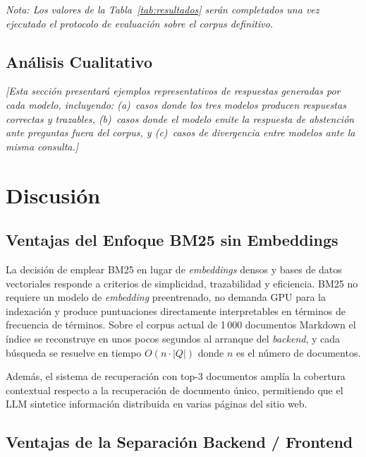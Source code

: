 \documentclass[conference]{IEEEtran}
\begin{document}
\textit{Nota: Los valores de la Tabla~\ref{tab:resultados} serán completados
una vez ejecutado el protocolo de evaluación sobre el corpus definitivo.}

\subsection{Análisis Cualitativo}

\textit{[Esta sección presentará ejemplos representativos de respuestas
generadas por cada modelo, incluyendo: (a)~casos donde los tres modelos
producen respuestas correctas y trazables, (b)~casos donde el modelo emite
la respuesta de abstención ante preguntas fuera del corpus, y (c)~casos de
divergencia entre modelos ante la misma consulta.]}

\section{Discusión}
\label{sec:disc}

\subsection{Ventajas del Enfoque BM25 sin Embeddings}

La decisión de emplear BM25 en lugar de \textit{embeddings} densos y bases de
datos vectoriales responde a criterios de simplicidad, trazabilidad y
eficiencia. BM25 no requiere un modelo de \textit{embedding} preentrenado, no
demanda GPU para la indexación y produce puntuaciones directamente
interpretables en términos de frecuencia de términos. Sobre el corpus
actual de 1\,000 documentos Markdown el índice se reconstruye en unos pocos
segundos al arranque del \textit{backend}, y cada búsqueda se resuelve en
tiempo $O(n \cdot |Q|)$ donde $n$ es el número de documentos.

Además, el sistema de recuperación con top-3 documentos amplía la cobertura
contextual respecto a la recuperación de documento único, permitiendo que el
LLM sintetice información distribuida en varias páginas del sitio web.

\subsection{Ventajas de la Separación Backend / Frontend}
\end{document}
